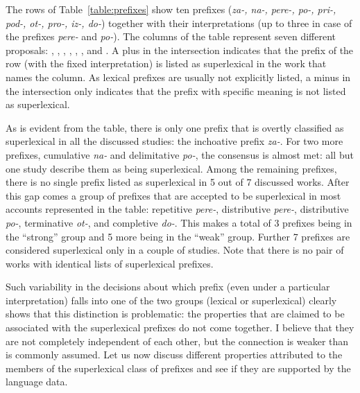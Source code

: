 The rows of Table~\ref{table:prefixes} show ten prefixes (\textit{za-, na-, pere-, po-, pri-, pod-, ot-, pro-, iz-, do-}) together with their interpretations (up to three in case of the prefixes \textit{pere-} and \textit{po-}). The columns of the table represent seven different proposals: \citealt{Babko-Malaya:99}, \citealt{Svenonius:04a}, \citealt{Svenonius:04b}, \citealt{Ramchand:04}, \citealt{Romanova:06}, \citealt{Tatevosov:09}, and \citealt{Svenonius:12}. A plus in the intersection indicates that the prefix of the row (with the fixed interpretation) is listed as superlexical in the work that names the column. As lexical prefixes are usually not explicitly listed, a minus in the intersection only indicates that the prefix with specific meaning is not listed as superlexical.

As is evident from the table, there is only one prefix that is overtly classified as superlexical in all the discussed studies: the inchoative prefix \textit{za-}. For two more prefixes, cumulative \textit{na-} and delimitative \textit{po-}, the consensus is almost met: all but one study describe them as being superlexical. Among the remaining prefixes, there is no single prefix listed as superlexical in 5 out of 7 discussed works. After this gap comes a group of prefixes that are accepted to be superlexical in most accounts represented in the table: repetitive \textit{pere-}, distributive \textit{pere-}, distributive \textit{po-}, terminative \textit{ot-}, and completive \textit{do-}. This makes a total of 3 prefixes being in the ``strong'' group and 5 more being in the ``weak'' group. Further 7 prefixes are considered superlexical only in a couple of studies. Note that there is no pair of works with identical lists of superlexical prefixes. 

Such variability in the decisions about which prefix (even under a particular interpretation) falls into one of the two groups (lexical or superlexical) clearly shows that this distinction is problematic: the properties that are claimed to be associated with the superlexical prefixes do not come together. I believe that they are not completely independent of each other, but the connection is weaker than is commonly assumed. Let us now discuss different properties attributed to the members of the superlexical class of prefixes and see if they are supported by the language data.



